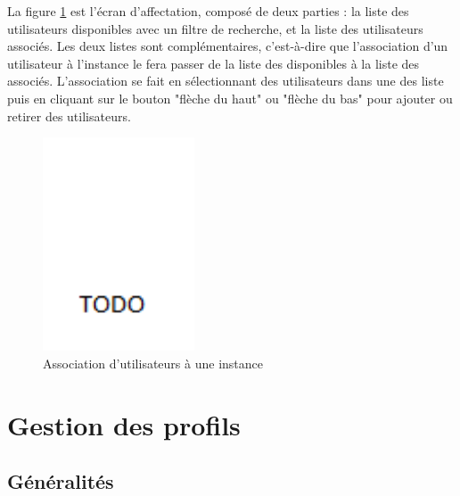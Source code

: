 La figure \ref{instances_utilisateurs} est l'écran d'affectation, composé de deux parties : la liste des utilisateurs disponibles avec un filtre de recherche, et la liste des utilisateurs associés.
Les deux listes sont complémentaires, c'est-à-dire que l'association d'un utilisateur à l'instance le fera passer de la liste des disponibles à la liste des associés.
L'association se fait en sélectionnant des utilisateurs dans une des liste puis en cliquant sur le bouton "flèche du haut" ou "flèche du bas" pour ajouter ou retirer des utilisateurs.
\begin{figure}[!h]
	\center
	\includegraphics[width=0.4\textwidth]{img/instances_utilisateurs.png}
	\caption{Association d'utilisateurs à une instance}
	\label{instances_utilisateurs}
\end{figure}


\section{Gestion des profils}


\subsection{Généralités}

